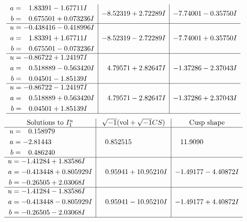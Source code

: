 \documentclass[1p]{elsarticle_modified}
\theoremstyle{definition}
\newcommand{\I}{\sqrt{-1}}
\begin{document}
$$\begin{array}{c|c|c}
\begin{aligned}
a &= \phantom{-}1.83391 - 1.67711 I \\
b &= \phantom{-}0.675501 + 0.073236 I\end{aligned}
 & -8.52319 + 2.72289 I & -7.74001 - 0.35750 I \\ \hline\begin{aligned}
u &= -0.438416 - 0.418996 I \\
a &= \phantom{-}1.83391 + 1.67711 I \\
b &= \phantom{-}0.675501 - 0.073236 I\end{aligned}
 & -8.52319 - 2.72289 I & -7.74001 + 0.35750 I \\ \hline\begin{aligned}
u &= -0.86722 + 1.24197 I \\
a &= \phantom{-}0.518889 - 0.563420 I \\
b &= \phantom{-}0.04501 - 1.85139 I\end{aligned}
 & \phantom{-}4.79571 + 2.82647 I & -1.37286 - 2.37043 I \\ \hline\begin{aligned}
u &= -0.86722 - 1.24197 I \\
a &= \phantom{-}0.518889 + 0.563420 I \\
b &= \phantom{-}0.04501 + 1.85139 I\end{aligned}
 & \phantom{-}4.79571 - 2.82647 I & -1.37286 + 2.37043 I\\
 \hline 
 \end{array}$$\newpage$$\begin{array}{c|c|c}  
\text{Solutions to }I^u_{1}& \I (\text{vol} + \sqrt{-1}CS) & \text{Cusp shape}\\
 \hline 
\begin{aligned}
u &= \phantom{-}0.158979\phantom{ +0.000000I} \\
a &= -2.81443\phantom{ +0.000000I} \\
b &= \phantom{-}0.486240\phantom{ +0.000000I}\end{aligned}
 & \phantom{-}0.852515\phantom{ +0.000000I} & \phantom{-}11.9090\phantom{ +0.000000I} \\ \hline\begin{aligned}
u &= -1.41284 + 1.83586 I \\
a &= -0.413448 + 0.805929 I \\
b &= -0.26505 + 2.03068 I\end{aligned}
 & \phantom{-}0.95941 + 10.95210 I & -1.49177 - 4.40872 I \\ \hline\begin{aligned}
u &= -1.41284 - 1.83586 I \\
a &= -0.413448 - 0.805929 I \\
b &= -0.26505 - 2.03068 I\end{aligned}
 & \phantom{-}0.95941 - 10.95210 I & -1.49177 + 4.40872 I\\
 \hline 
 \end{array}$$\newpage\newpage\renewcommand{\arraystretch}{1}
\end{document}
